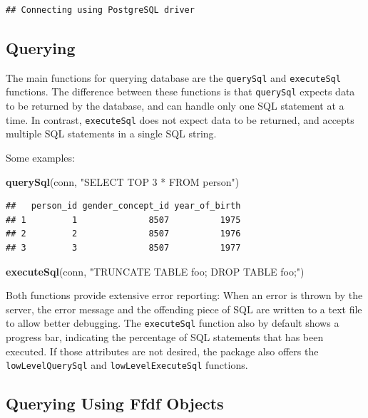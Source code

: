 \documentclass[11pt]{book}
\newenvironment{Shaded}{\begin{snugshade}}{\end{snugshade}}
\newcommand{\KeywordTok}[1]{\textcolor[rgb]{0.13,0.29,0.53}{\textbf{#1}}}
\newcommand{\StringTok}[1]{\textcolor[rgb]{0.31,0.60,0.02}{#1}}
\newcommand{\NormalTok}[1]{#1}
\theoremstyle{definition}
\theoremstyle{definition}
\theoremstyle{definition}
\theoremstyle{remark}
\begin{document}
\begin{verbatim}
## Connecting using PostgreSQL driver
\end{verbatim}

\subsection{Querying}\label{querying}

The main functions for querying database are the \texttt{querySql} and
\texttt{executeSql} functions. The difference between these functions is
that \texttt{querySql} expects data to be returned by the database, and
can handle only one SQL statement at a time. In contrast,
\texttt{executeSql} does not expect data to be returned, and accepts
multiple SQL statements in a single SQL string.

Some examples:

\begin{Shaded}
\begin{Highlighting}[]
\KeywordTok{querySql}\NormalTok{(conn, }\StringTok{"SELECT TOP 3 * FROM person"}\NormalTok{)}
\end{Highlighting}
\end{Shaded}

\begin{verbatim}
##   person_id gender_concept_id year_of_birth
## 1         1              8507          1975
## 2         2              8507          1976
## 3         3              8507          1977
\end{verbatim}

\begin{Shaded}
\begin{Highlighting}[]
\KeywordTok{executeSql}\NormalTok{(conn, }\StringTok{"TRUNCATE TABLE foo; DROP TABLE foo;"}\NormalTok{)}
\end{Highlighting}
\end{Shaded}

Both functions provide extensive error reporting: When an error is
thrown by the server, the error message and the offending piece of SQL
are written to a text file to allow better debugging. The
\texttt{executeSql} function also by default shows a progress bar,
indicating the percentage of SQL statements that has been executed. If
those attributes are not desired, the package also offers the
\texttt{lowLevelQuerySql} and \texttt{lowLevelExecuteSql} functions.

\subsection{Querying Using Ffdf
Objects}\label{querying-using-ffdf-objects}
\end{document}
